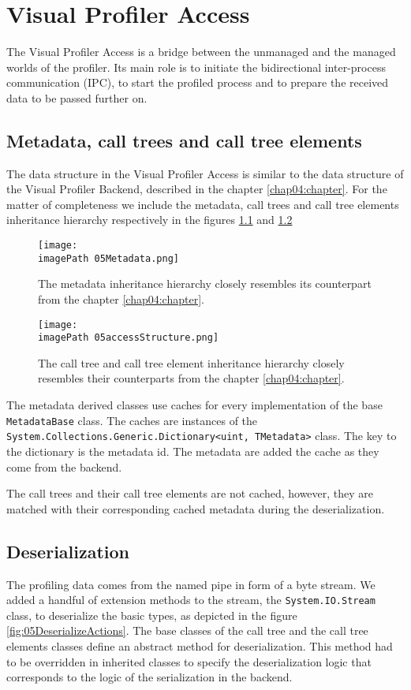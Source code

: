 \chapter{Visual Profiler Access}
The Visual Profiler Access is a bridge between the unmanaged and the managed worlds of the profiler. Its main role is to initiate the bidirectional inter-process communication (IPC), to start the profiled process and to prepare the received data to be passed further on.

\section{Metadata, call trees and call tree elements}
The data structure in the Visual Profiler Access is similar to the data structure of the Visual Profiler Backend, described in the chapter \ref{chap04:chapter}. For the matter of completeness we include the metadata, call trees and call tree elements inheritance hierarchy respectively in the figures \ref{fig:05Metadata} and \ref{fig:05accessStructure}

\begin{figure}
	\centering
		\texttt{[image: \\imagePath 05Metadata.png]}
		\caption{The metadata inheritance hierarchy closely resembles its counterpart from the chapter \ref{chap04:chapter}.}
	\label{fig:05Metadata}
\end{figure}

\begin{figure}
	\centering
		\texttt{[image: \\imagePath 05accessStructure.png]}
		\caption{The call tree and call tree element inheritance hierarchy closely resembles their counterparts from the chapter \ref{chap04:chapter}.}
	\label{fig:05accessStructure}
\end{figure}

The metadata derived classes use caches for every implementation of the base \texttt{MetadataBase} class. The caches are instances of the \texttt{System.Collections.Generic.Dictionary\textless uint, TMetadata\textgreater} class. The key to the dictionary is the metadata id. The metadata are added the cache as they come from the backend.

The call trees and their call tree elements are not cached, however, they are matched with their corresponding cached metadata during the deserialization.

\section{Deserialization}
The profiling data comes from the named pipe in form of a byte stream. We added a handful of extension methods to the stream, the \texttt{System.IO.Stream} class, to deserialize the basic types, as depicted in the figure \ref{fig:05DeserializeActions}. The base classes of the call tree and the call tree elements classes define an abstract method for deserialization. This method had to be overridden in inherited classes to specify the deserialization logic that corresponds to the logic of the serialization in the backend.

